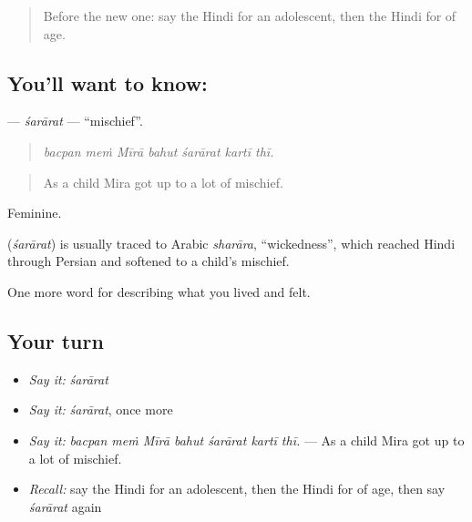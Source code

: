 \label{lesson:HI-C499-sararat}



\begin{quote}
Before the new one: say the Hindi for an adolescent, then the Hindi for of age.
\end{quote}

\subsection*{You'll want to know: }
\textbf{} — \emph{śarārat} — \textquotedblleft{}mischief\textquotedblright{}.

\begin{quote}
      
\end{quote}

\begin{quote}
\emph{bacpan meṁ Mīrā bahut śarārat kartī thī.}
\end{quote}

\begin{quote}
As a child Mira got up to a lot of mischief.
\end{quote}

Feminine.

\begin{cousinweb}
\textbf{} (\emph{śarārat}) is usually traced to Arabic \emph{sharāra}, \textquotedblleft{}wickedness\textquotedblright{}, which reached Hindi through Persian and softened to a child's mischief.
\end{cousinweb}

\begin{grammarlens}[title={What you've built}]
One more word for describing what you lived and felt.
\end{grammarlens}

\subsection*{Your turn}
\begin{itemize}
\raggedright
  \item \emph{Say it:} \emph{śarārat}
  \item \emph{Say it:} \emph{śarārat}, once more
  \item \emph{Say it:} \emph{bacpan meṁ Mīrā bahut śarārat kartī thī.} — As a child Mira got up to a lot of mischief.
  \item \emph{Recall:} say the Hindi for an adolescent, then the Hindi for of age, then say \emph{śarārat} again
\end{itemize}

